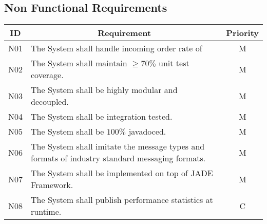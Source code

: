 \subsection{Non Functional Requirements}
\begin{table}[htbp]
\begin{center}
\begin{longtable}{c p{4.2in} c }

\multicolumn{1}{c}{\textbf{ID}}           &
\multicolumn{1}{c}{\textbf{Requirement}}  &
\multicolumn{1}{c}{\textbf{Priority}}     \\        
\toprule

N01  & The System shall handle incoming order rate of              & M \\ 
N02  & The System shall maintain $\geq70\%$ unit test coverage.    & M \\
N03  & The System shall be highly modular and decoupled.           & M \\
N04  & The System shall be integration tested.	                   & M \\
N05  & The System shall be $100\%$ javadoced.	                   & M \\
N06  & The System shall imitate the message types and formats of industry standard messaging formats. & M \\
N07  & The System shall be implemented on top of JADE Framework.   & M \\
N08  & The System shall publish performance statistics at runtime. & C \\

         
\end{longtable}
\end{center}
\end{table}

